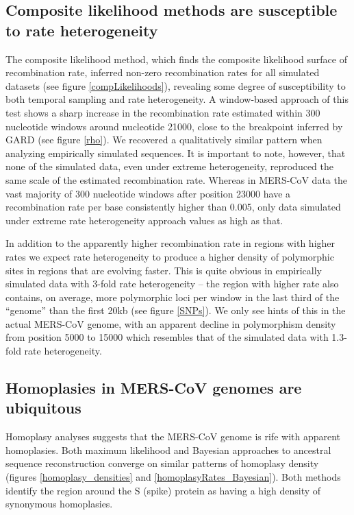 \documentclass[11pt,oneside,letterpaper]{article}
\begin{document}
\subsection*{Composite likelihood methods are susceptible to rate heterogeneity}
The composite likelihood method, which finds the composite likelihood surface of recombination rate, inferred non-zero recombination rates for all simulated datasets (see figure \ref{compLikelihoods}), revealing some degree of susceptibility to both temporal sampling and rate heterogeneity.
A window-based approach of this test shows a sharp increase in the recombination rate estimated within 300 nucleotide windows around nucleotide 21000, close to the breakpoint inferred by GARD (see figure \ref{rho}).
We recovered a qualitatively similar pattern when analyzing empirically simulated sequences.
It is important to note, however, that none of the simulated data, even under extreme heterogeneity, reproduced the same scale of the estimated recombination rate.
Whereas in MERS-CoV data the vast majority of 300 nucleotide windows after position 23000 have a recombination rate per base consistently higher than 0.005, only data simulated under extreme rate heterogeneity approach values as high as that.

In addition to the apparently higher recombination rate in regions with higher rates we expect rate heterogeneity to produce a higher density of polymorphic sites in regions that are evolving faster.
This is quite obvious in empirically simulated data with 3-fold rate heterogeneity -- the region with higher rate also contains, on average, more polymorphic loci per window in the last third of the ``genome'' than the first 20kb (see figure \ref{SNPs}).
We only see hints of this in the actual MERS-CoV genome, with an apparent decline in polymorphism density from position 5000 to 15000 which resembles that of the simulated data with 1.3-fold rate heterogeneity.

\subsection*{Homoplasies in MERS-CoV genomes are ubiquitous}
Homoplasy analyses suggests that the MERS-CoV genome is rife with apparent homoplasies.
Both maximum likelihood and Bayesian approaches to ancestral sequence reconstruction converge on similar patterns of homoplasy density (figures \ref{homoplasy_densities} and \ref{homoplasyRates_Bayesian}).
Both methods identify the region around the S (spike) protein as having a high density of synonymous homoplasies.
\end{document}
